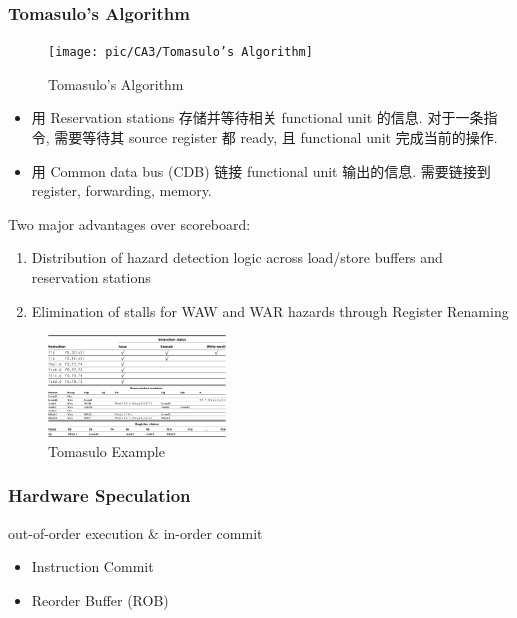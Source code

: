 \subsubsection{Tomasulo's Algorithm}
\begin{figure}[!htb]
    \centering
    \texttt{[image: pic/CA3/Tomasulo’s Algorithm]}
    \caption{Tomasulo's Algorithm}
\end{figure}


\begin{itemize}
    \item 用 Reservation stations 存储并等待相关 functional unit 的信息. 对于一条指令, 需要等待其 source register 都 ready, 且 functional unit 完成当前的操作. 
    \item 用 Common data bus (CDB) 链接 functional unit 输出的信息. 需要链接到 register, forwarding, memory. 
\end{itemize}

Two major advantages over scoreboard:
\begin{enumerate}\scriptsize
    \item Distribution of hazard detection logic
    across load/store buffers and
    reservation stations
    \item Elimination of stalls for WAW and WAR
    hazards through Register Renaming
\end{enumerate}

\begin{figure}[!htb]
    \centering
    \includegraphics[width=0.42\textwidth]{pic/CA3/Tomasulo Example}
    \caption{Tomasulo Example}
\end{figure}



\subsubsection{Hardware Speculation}
out-of-order execution \& in-order commit
\begin{itemize}
    \item Instruction Commit
    \item Reorder Buffer (ROB)
\end{itemize}

